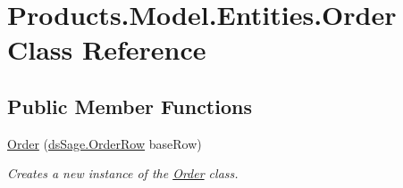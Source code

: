 \hypertarget{class_products_1_1_model_1_1_entities_1_1_order}{}\section{Products.\+Model.\+Entities.\+Order Class Reference}
\label{class_products_1_1_model_1_1_entities_1_1_order}
\subsection*{Public Member Functions}
\begin{DoxyCompactItemize}
\item 
\hyperlink{class_products_1_1_model_1_1_entities_1_1_order_a86543d6e38bf02ab2c98d9967ddc1de6}{Order} (\hyperlink{class_products_1_1_data_1_1ds_sage_1_1_order_row}{ds\+Sage.\+Order\+Row} base\+Row)
\begin{DoxyCompactList}\small\item\em Creates a new instance of the \hyperlink{class_products_1_1_model_1_1_entities_1_1_order}{Order} class. \end{DoxyCompactList}\end{DoxyCompactItemize}
